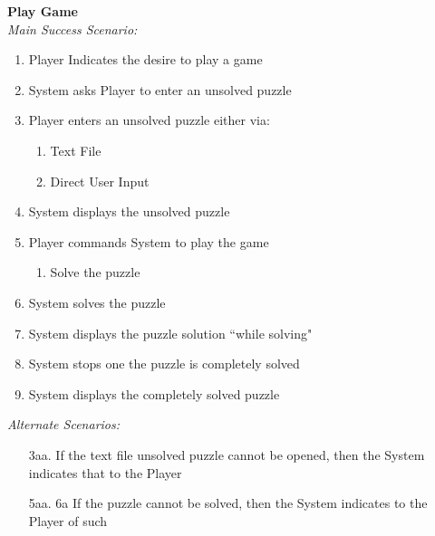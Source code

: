 \documentclass[letterpaper]{article}
\begin{document}
\noindent
\textbf{Play Game}\\
\textit{Main Success Scenario:}
\begin{enumerate}
\item Player Indicates the desire to play a game
\item System asks Player to enter an unsolved puzzle
\item Player enters an unsolved puzzle either via:
\begin{enumerate}
\item Text File
\item Direct User Input
\end{enumerate}
\item System displays the unsolved puzzle
\item Player commands System to play the game
\begin{enumerate}
\item Solve the puzzle
\end{enumerate}
\item System solves the puzzle
\item System displays the puzzle solution ``while solving"
\item System stops one the puzzle is completely solved
\item System displays the completely solved puzzle
\end{enumerate}
\textit{Alternate Scenarios:}
\begin{enumerate}
\item[3aa.] If the text file unsolved puzzle cannot be opened, then
        the System indicates that to the Player
\item[5aa. 6a] If the puzzle cannot be solved, then the System
        indicates to the Player of such
\end{enumerate}
\end{document}

